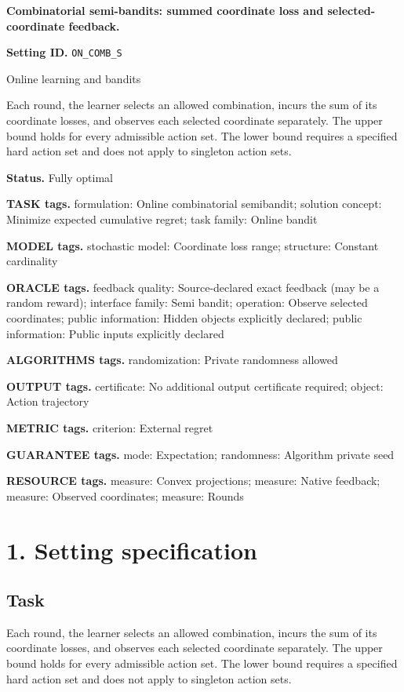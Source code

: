 \documentclass[10pt,a4paper]{article}
\begin{document}
\raggedright

{\LARGE\bfseries\sffamily\color{AtlasNavy} Combinatorial semi-bandits: summed coordinate loss and selected-coordinate feedback.\par}\vspace{5pt}
\textbf{Setting ID.} \texttt{ON\_\allowbreak{}COMB\_\allowbreak{}S}

Online learning and bandits

Each round, the learner selects an allowed combination, incurs the sum of its coordinate losses, and observes each selected coordinate separately. The upper bound holds for every admissible action set. The lower bound requires a specified hard action set and does not apply to singleton action sets.

\textbf{Status.} Fully optimal

\textbf{TASK tags.} formulation: Online combinatorial semibandit; solution concept: Minimize expected cumulative regret; task family: Online bandit

\textbf{MODEL tags.} stochastic model: Coordinate loss range; structure: Constant cardinality

\textbf{ORACLE tags.} feedback quality: Source-declared exact feedback (may be a random reward); interface family: Semi bandit; operation: Observe selected coordinates; public information: Hidden objects explicitly declared; public information: Public inputs explicitly declared

\textbf{ALGORITHMS tags.} randomization: Private randomness allowed

\textbf{OUTPUT tags.} certificate: No additional output certificate required; object: Action trajectory

\textbf{METRIC tags.} criterion: External regret

\textbf{GUARANTEE tags.} mode: Expectation; randomness: Algorithm private seed

\textbf{RESOURCE tags.} measure: Convex projections; measure: Native feedback; measure: Observed coordinates; measure: Rounds

\section{1. Setting specification}
\subsection{Task}
Each round, the learner selects an allowed combination, incurs the sum of its coordinate losses, and observes each selected coordinate separately. The upper bound holds for every admissible action set. The lower bound requires a specified hard action set and does not apply to singleton action sets.
\end{document}
